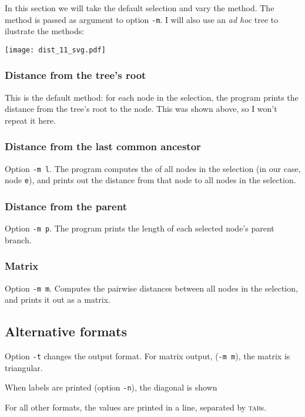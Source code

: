 In this section we will take the default selection and vary the method. The
method is passed as argument to option \texttt{-m}. I will also use an
\emph{ad hoc} tree to ilustrate the methods:

\texttt{[image: dist\_11\_svg.pdf]}

\subsubsection{Distance from the tree's root}

This is the default method: for each node in the selection, the program prints
the distance from the tree's root to the node. This was shown above, so I
won't repeat it here.

\subsubsection{Distance from the last common ancestor}
Option \texttt{-m l}. The program computes the \lca{} of all nodes in the
selection (in our case, node \texttt{e}), and prints out the distance from
that node to all nodes in the selection.



\subsubsection{Distance from the parent}
Option \texttt{-m p}. The program prints the length of each selected node's
parent branch.



\subsubsection{Matrix}
Option \texttt{-m m}. Computes the pairwise distances between all nodes in the
selection, and prints it out as a matrix.



\subsection{Alternative formats}

Option \texttt{-t} changes the output format. For matrix output, (\texttt{-m
m}), the matrix is triangular. 


When labels are printed (option \texttt{-n}), the diagonal is shown



For all other formats, the values are printed in a line, separated by
\textsc{tab}s.


